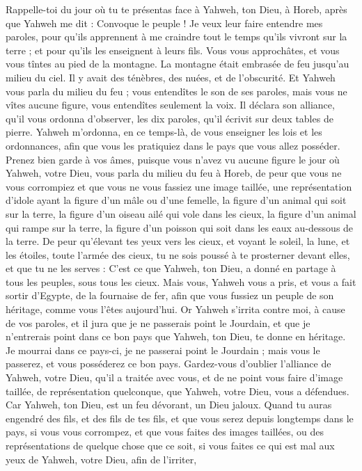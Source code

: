 \begin{multicols}{2}
Rappelle-toi du jour où tu te présentas face à Yahweh, ton Dieu, à Horeb, après que Yahweh me dit : Convoque le peuple ! Je veux leur faire entendre mes paroles, pour qu’ils apprennent à me craindre tout le temps qu'ils vivront sur la terre ; et pour qu’ils les enseignent à leurs fils.
Vous vous approchâtes, et vous vous tîntes au pied de la montagne. La montagne était embrasée de feu jusqu'au milieu du ciel. Il y avait des ténèbres, des nuées, et de l’obscurité.
Et Yahweh vous parla du milieu du feu ; vous entendîtes le son de ses paroles, mais vous ne vîtes aucune figure, vous entendîtes seulement la voix.
Il déclara son alliance, qu’il vous ordonna d'observer, les dix paroles, qu'il écrivit sur deux tables de pierre.
Yahweh m’ordonna, en ce temps-là, de vous enseigner les lois et les ordonnances, afin que vous les pratiquiez dans le pays que vous allez posséder.
Prenez bien garde à vos âmes, puisque vous n'avez vu aucune figure le jour où Yahweh, votre Dieu, vous parla du milieu du feu à Horeb,
de peur que vous ne vous corrompiez et que vous ne vous fassiez une image taillée, une représentation d’idole ayant la figure d'un mâle ou d'une femelle,
la figure d’un animal qui soit sur la terre, la figure d'un oiseau ailé qui vole dans les cieux,
la figure d’un animal qui rampe sur la terre, la figure d’un poisson qui soit dans les eaux au-dessous de la terre.
De peur qu’élevant tes yeux vers les cieux, et voyant le soleil, la lune, et les étoiles, toute l'armée des cieux, tu ne sois poussé à te prosterner devant elles, et que tu ne les serves : C’est ce que Yahweh, ton Dieu, a donné en partage à tous les peuples, sous tous les cieux.
Mais vous, Yahweh vous a pris, et vous a fait sortir d'Egypte, de la fournaise de fer, afin que vous fussiez un peuple de son héritage, comme vous l’êtes aujourd'hui.
Or Yahweh s’irrita contre moi, à cause de vos paroles, et il jura que je ne passerais point le Jourdain, et que je n'entrerais point dans ce bon pays que Yahweh, ton Dieu, te donne en héritage.
Je mourrai dans ce pays-ci, je ne passerai point le Jourdain ; mais vous le passerez, et vous posséderez ce bon pays.
Gardez-vous d’oublier l'alliance de Yahweh, votre Dieu, qu’il a traitée avec vous, et de ne point vous faire d’image taillée, de représentation quelconque, que Yahweh, votre Dieu, vous a défendues.
Car Yahweh, ton Dieu, est un feu dévorant, un Dieu jaloux.
Quand tu auras engendré des fils, et des fils de tes fils, et que vous serez depuis longtemps dans le pays, si vous vous corrompez, et que vous faites des images taillées, ou des représentations de quelque chose que ce soit, si vous faites ce qui est mal aux yeux de Yahweh, votre Dieu, afin de l'irriter,

\end{multicols}
